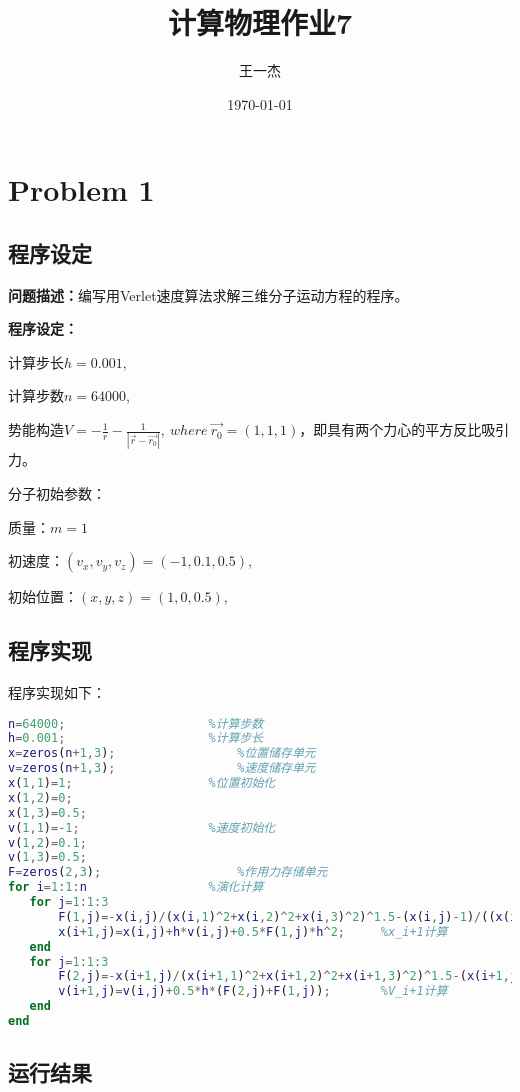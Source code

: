 \documentclass{article}
\title{计算物理作业7} %
\author[a]{王一杰} %
\affil[a]{中国科学技术大学}
\date{\today}%
\begin{document}
\maketitle

\section{Problem 1}
\subsection{程序设定}
\textbf{问题描述：}编写用Verlet速度算法求解三维分子运动方程的程序。

\textbf{程序设定：}

\quad 计算步长$h=0.001$,

\quad 计算步数$n=64000$,

\quad 势能构造$V=-\frac{1}{r}-\frac{1}{|\overrightarrow{r}-\overrightarrow{r_0}|},\ where\  \overrightarrow{r_0}=(1,1,1)$，即具有两个力心的平方反比吸引力。

\quad 分子初始参数：

\qquad 质量：$m=1$

\qquad 初速度：$(v_x,v_y,v_z)=(-1,0.1,0.5)$,

\qquad 初始位置：$(x,y,z)=(1,0,0.5)$,

\subsection{程序实现}

程序实现如下：

\begin{lstlisting}[language=MATLAB]
n=64000;					%计算步数
h=0.001;					%计算步长
x=zeros(n+1,3);					%位置储存单元
v=zeros(n+1,3);					%速度储存单元
x(1,1)=1;					%位置初始化
x(1,2)=0;
x(1,3)=0.5;
v(1,1)=-1;					%速度初始化
v(1,2)=0.1;
v(1,3)=0.5;
F=zeros(2,3);					%作用力存储单元
for i=1:1:n					%演化计算
   for j=1:1:3
       F(1,j)=-x(i,j)/(x(i,1)^2+x(i,2)^2+x(i,3)^2)^1.5-(x(i,j)-1)/((x(i,1)-1)^2+(x(i,2)-1)^2+(x(i,3)-1)^2)^1.5;				%F_i计算
       x(i+1,j)=x(i,j)+h*v(i,j)+0.5*F(1,j)*h^2;		%x_i+1计算
   end
   for j=1:1:3
       F(2,j)=-x(i+1,j)/(x(i+1,1)^2+x(i+1,2)^2+x(i+1,3)^2)^1.5-(x(i+1,j)-1)/((x(i+1,1)-1)^2+(x(i+1,2)-1)^2+(x(i+1,3)-1)^2)^1.5;		%F_i+1计算
       v(i+1,j)=v(i,j)+0.5*h*(F(2,j)+F(1,j));		%V_i+1计算
   end
end
\end{lstlisting}

\subsection{运行结果}
\end{document}
